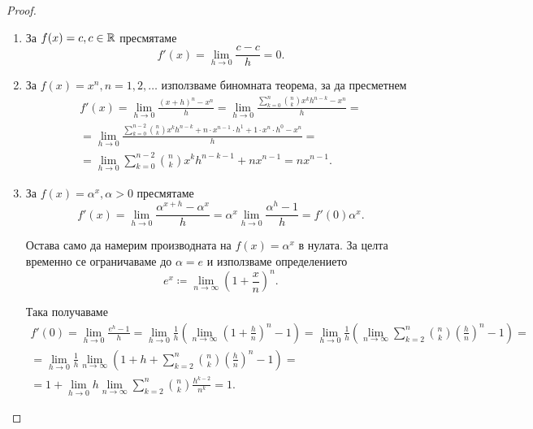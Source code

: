 \documentclass[numbers=endperiod, DIV=15, bibliography=totocnumbered]{scrartcl}
\begin{document}
\begin{proof}
  \mbox{}
  \begin{enumerate}
    \item За $f(x) = c, c \in \mathbb{R}$ пресмятаме
    \begin{displaymath}
      f'(x) = \lim_{h \to 0} \frac {c - c} h = 0.
    \end{displaymath}

    \item За $f(x) = x^n, n = 1, 2, \ldots$ използваме биномната теорема, за да пресметнем
    \begin{multline*}
      f'(x)
      =
      \lim_{h \to 0} \frac {{(x+h)}^n - x^n} h
      =
      \lim_{h \to 0} \frac {\sum_{k=0}^n {n \choose k} x^k h^{n-k} - x^n} h
      = \\ =
      \lim_{h \to 0} \frac {\sum_{k=0}^{n-2} {n \choose k} x^k h^{n-k} + n \cdot x^{n-1} \cdot h^1 + 1 \cdot x^n \cdot h^0 - x^n} h
      = \\ =
      \lim_{h \to 0} \sum_{k=0}^{n-2} {n \choose k} x^k h^{n-k-1} + n x^{n-1}
      =
      n x^{n-1}.
    \end{multline*}

    \item За $f(x) = \alpha^x, \alpha > 0$ пресмятаме
    \begin{displaymath}
      f'(x)
      =
      \lim_{h \to 0} \frac {\alpha^{x+h} - \alpha^x} h
      =
      \alpha^x \lim_{h \to 0} \frac {\alpha^h - 1} h
      =
      f'(0) \alpha^x.
    \end{displaymath}

    Остава само да намерим производната на $f(x) = \alpha^x$ в нулата. За целта временно се ограничаваме до $\alpha = e$ и използваме определението
    \begin{displaymath}
      e^x \coloneqq \lim_{n \to \infty} {\left( 1 + \frac x n \right)}^n.
    \end{displaymath}

    Така получаваме
    \begin{multline*}
      f'(0)
      =
      \lim_{h \to 0} \frac {e^h - 1} h
      =
      \lim_{h \to 0} \frac 1 h \left( \lim_{n \to \infty} {\left( 1 + \frac h n \right)}^n - 1 \right)
      =
      \lim_{h \to 0} \frac 1 h \left( \lim_{n \to \infty} \sum_{k=2}^n {n \choose k} {\left(\frac h n \right)}^n - 1 \right)
      = \\ =
      \lim_{h \to 0} \frac 1 h \lim_{n \to \infty} \left( 1 + h + \sum_{k=2}^n {n \choose k} {\left(\frac h n \right)}^n - 1 \right)
      = \\ =
      1 + \lim_{h \to 0} h \lim_{n \to \infty} \sum_{k=2}^n {n \choose k} \frac {h^{k-2}} {n^k} = 1.
    \end{multline*}


\end{enumerate}
\end{proof}
\end{document}
